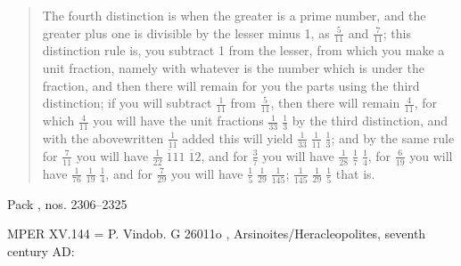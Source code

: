 \documentclass{article}
\begin{document}
\begin{quote}
The fourth distinction is when the greater is a prime number, and the greater plus one is divisible by the lesser minus 1, as
$\frac{5}{11}$ and $\frac{7}{11}$; this distinction rule is, you subtract 1 from the lesser, from which you make a unit fraction, namely with whatever is the number which is under the
fraction, and then there will
remain for you the parts using the third distinction; if you will subtract
$\frac{1}{11}$ from $\frac{5}{11}$, then there will remain $\frac{4}{11}$,
for which $\frac{4}{11}$ you will have the unit fractions $\frac{1}{33} \; \frac{1}{3}$
by the third distinction, and with the abovewritten $\frac{1}{11}$ added this will yield
$\frac{1}{33} \; \frac{1}{11} \; \frac{1}{3}$; and by the same rule for $\frac{7}{11}$ you will have
$\frac{1}{22} \; \overline{1}{11} \; \overline{1}{2}$, and for $\frac{3}{7}$ you will have 
$\frac{1}{28} \; \frac{1}{7} \; \frac{1}{4}$, for $\frac{6}{19}$ you will have $\frac{1}{76} \; \frac{1}{19} \; \frac{1}{4}$,
and for $\frac{7}{29}$ you will have $\frac{1}{5} \; \frac{1}{29} \; \frac{1}{145}$;
$\frac{1}{145} \; \frac{1}{29} \; \frac{1}{5}$ that is.
\end{quote}








Pack \cite{pack}, nos. 2306--2325










MPER XV.144 = P. Vindob. G 26011o \cite[p.~134]{MPERXV}, Arsinoites/Heracleopolites, seventh century AD:
\end{document}
